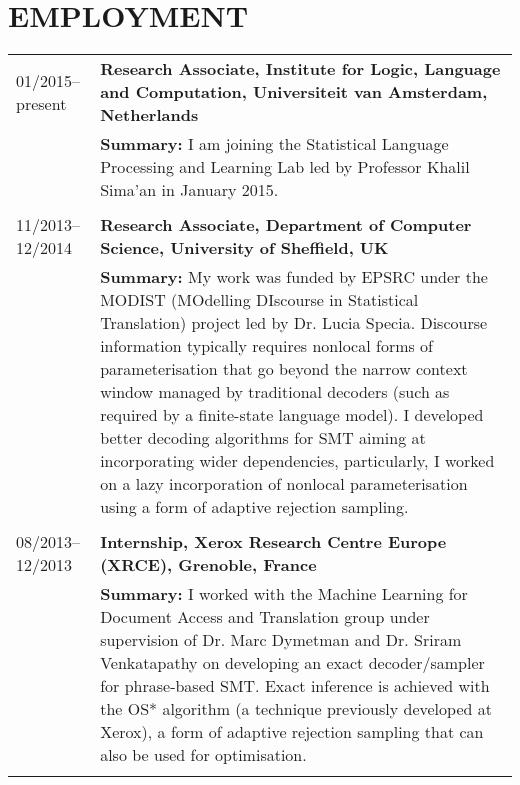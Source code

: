 \section*{EMPLOYMENT}

\begin{tabular}{p{2.92cm}  p{13cm}}
01/2015--present & \bf Research Associate, Institute for Logic, Language and Computation, Universiteit van Amsterdam, Netherlands \\
	& {\bf Summary:} I am joining the Statistical Language Processing and Learning Lab led by Professor Khalil Sima'an in January 2015. 
	 \\
    & \\
11/2013--12/2014 & \bf Research Associate, Department of Computer Science, University of Sheffield, UK \\
	& {\bf Summary:} My work was funded by EPSRC under the MODIST (MOdelling DIscourse in Statistical Translation) project led by Dr. Lucia Specia. Discourse information typically requires nonlocal forms of parameterisation that go beyond the narrow context window managed by traditional decoders (such as required by a finite-state language model). I developed better decoding algorithms for SMT aiming at incorporating wider dependencies, particularly, I worked on a lazy incorporation of nonlocal parameterisation using a form of adaptive rejection sampling. 
	 \\
    & \\
08/2013--12/2013	& \bf Internship, Xerox Research Centre Europe (XRCE), Grenoble, France \\
	& {\bf Summary:} I worked with the Machine Learning for Document Access and Translation group under supervision of Dr. Marc Dymetman and Dr. Sriram Venkatapathy  on developing an exact decoder/sampler for phrase-based SMT. Exact inference is achieved with the OS* algorithm (a technique previously developed at Xerox), a form of adaptive rejection sampling that can also be used for optimisation. \\
	& \\

\end{tabular}
